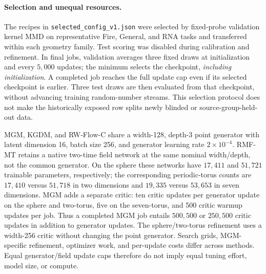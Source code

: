 \paragraph{Selection and unequal resources.}
The recipes in \texttt{selected\_config\_v1.json} were selected by fixed-probe
validation kernel MMD on representative Fire, General, and RNA tasks and
transferred within each geometry family. Test scoring was disabled during
calibration and refinement. In final jobs, validation averages three fixed
draws at initialization and every $5{,}000$ updates; the minimum selects the
checkpoint, \emph{including initialization}. A completed job reaches the full
update cap even if its selected checkpoint is earlier. Three test draws are
then evaluated from that checkpoint, without advancing training random-number
streams. This selection protocol does not make the historically exposed row
splits newly blinded or source-group-held-out data.

MGM, KGDM, and RW-Flow-C share a width-128, depth-3 point generator with latent
dimension 16, batch size 256, and generator learning rate $2\times10^{-4}$.
RMF-MT retains a native two-time field network at the same nominal width/depth,
not the common generator. On the sphere these networks have $17{,}411$ and
$51{,}721$ trainable parameters, respectively; the corresponding periodic-torus
counts are $17{,}410$ versus $51{,}718$ in two dimensions and $19{,}335$ versus
$53{,}653$ in seven dimensions. MGM adds a separate critic: ten critic updates
per generator update on the sphere and two-torus, five on the seven-torus,
and 500 critic warmup updates per job. Thus a completed MGM job entails
$500{,}500$ or $250{,}500$ critic updates in addition to generator updates.
The sphere/two-torus refinement uses a width-256 critic without changing the
point generator. Search grids, MGM-specific refinement, optimizer work, and
per-update costs differ across methods. Equal generator/field update caps
therefore do not imply equal tuning effort, model size, or compute.

